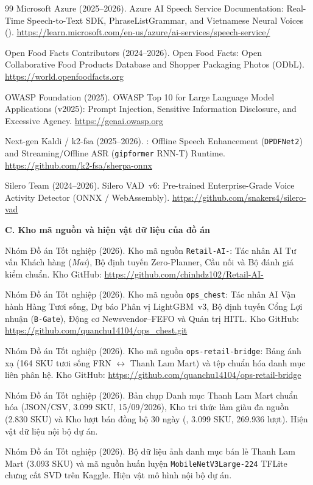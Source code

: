 \begin{thebibliography}{99}
Microsoft Azure (2025--2026).
Azure AI Speech Service Documentation: Real-Time Speech-to-Text SDK, PhraseListGrammar, and Vietnamese Neural Voices ().
\url{https://learn.microsoft.com/en-us/azure/ai-services/speech-service/}

Open Food Facts Contributors (2024--2026).
Open Food Facts: Open Collaborative Food Products Database and Shopper Packaging Photos (ODbL).
\url{https://world.openfoodfacts.org}

OWASP Foundation (2025).
OWASP Top 10 for Large Language Model Applications (v2025): Prompt Injection, Sensitive Information Disclosure, and Excessive Agency.
\url{https://genai.owasp.org}

Next-gen Kaldi / k2-fsa (2025--2026).
: Offline Speech Enhancement (\texttt{DPDFNet2}) and Streaming/Offline ASR (\texttt{gipformer} RNN-T) Runtime.
\url{https://github.com/k2-fsa/sherpa-onnx}

Silero Team (2024--2026).
Silero VAD~v6: Pre-trained Enterprise-Grade Voice Activity Detector (ONNX / WebAssembly).
\url{https://github.com/snakers4/silero-vad}

\item[]\hspace*{-\leftmargin}\textbf{C. Kho mã nguồn và hiện vật dữ liệu của đồ án}

Nhóm Đồ án Tốt nghiệp (2026).
Kho mã nguồn \texttt{Retail-AI-}: Tác nhân AI Tư vấn Khách hàng (\emph{Mai}), Bộ định tuyến Zero-Planner, Cầu nối  và Bộ đánh giá kiểm chuẩn.
Kho GitHub: \url{https://github.com/chinhdz102/Retail-AI-}

Nhóm Đồ án Tốt nghiệp (2026).
Kho mã nguồn \texttt{ops\_chest}: Tác nhân AI Vận hành Hàng Tươi sống, Dự báo Phân vị LightGBM~v3, Bộ định tuyến Cổng Lợi nhuận (\texttt{B-Gate}), Động cơ Newsvendor--FEFO và Quản trị HITL.
Kho GitHub: \url{https://github.com/quanchu14104/ops_chest.git}

Nhóm Đồ án Tốt nghiệp (2026).
Kho mã nguồn \texttt{ops-retail-bridge}: Bảng ánh xạ  (164 SKU tươi sống FRN $\leftrightarrow$ Thanh Lam Mart) và tệp chuẩn hóa danh mục liên phân hệ.
Kho GitHub: \url{https://github.com/quanchu14104/ops-retail-bridge}

Nhóm Đồ án Tốt nghiệp (2026).
Bản chụp Danh mục Thanh Lam Mart chuẩn hóa (JSON/CSV, 3.099 SKU, 15/09/2026), Kho tri thức làm giàu đa nguồn (2.830 SKU) và Kho lượt bán đồng bộ 30 ngày (, 3.099 SKU, 269.936 lượt).
Hiện vật dữ liệu nội bộ dự án.

Nhóm Đồ án Tốt nghiệp (2026).
Bộ dữ liệu ảnh danh mục bán lẻ Thanh Lam Mart (3.093 SKU) và mã nguồn huấn luyện \texttt{MobileNetV3Large-224} TFLite chưng cất SVD trên Kaggle.
Hiện vật mô hình nội bộ dự án.

\end{thebibliography}

